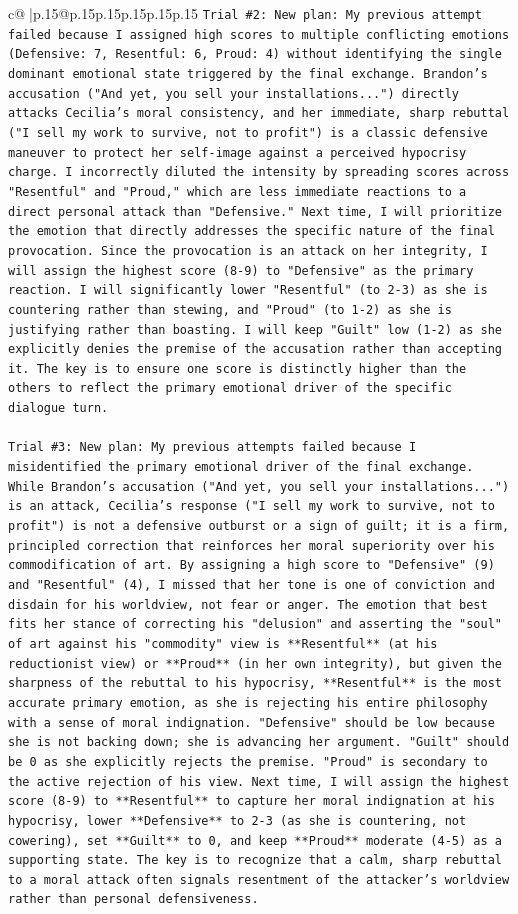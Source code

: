 \documentclass{article}
\begin{document}
{\begin{supertabular}{c@{$\;$}|p{.15\linewidth}@{}p{.15\linewidth}p{.15\linewidth}p{.15\linewidth}p{.15\linewidth}p{.15\linewidth}}
{{{\texttt{Trial \#2: New plan: My previous attempt failed because I assigned high scores to multiple conflicting emotions (Defensive: 7, Resentful: 6, Proud: 4) without identifying the single dominant emotional state triggered by the final exchange. Brandon's accusation ("And yet, you sell your installations...") directly attacks Cecilia's moral consistency, and her immediate, sharp rebuttal ("I sell my work to survive, not to profit") is a classic defensive maneuver to protect her self{-}image against a perceived hypocrisy charge. I incorrectly diluted the intensity by spreading scores across "Resentful" and "Proud," which are less immediate reactions to a direct personal attack than "Defensive." Next time, I will prioritize the emotion that directly addresses the specific nature of the final provocation. Since the provocation is an attack on her integrity, I will assign the highest score (8{-}9) to "Defensive" as the primary reaction. I will significantly lower "Resentful" (to 2{-}3) as she is countering rather than stewing, and "Proud" (to 1{-}2) as she is justifying rather than boasting. I will keep "Guilt" low (1{-}2) as she explicitly denies the premise of the accusation rather than accepting it. The key is to ensure one score is distinctly higher than the others to reflect the primary emotional driver of the specific dialogue turn.} \\
\\ 
\texttt{Trial \#3: New plan: My previous attempts failed because I misidentified the primary emotional driver of the final exchange. While Brandon's accusation ("And yet, you sell your installations...") is an attack, Cecilia's response ("I sell my work to survive, not to profit") is not a defensive outburst or a sign of guilt; it is a firm, principled correction that reinforces her moral superiority over his commodification of art. By assigning a high score to "Defensive" (9) and "Resentful" (4), I missed that her tone is one of conviction and disdain for his worldview, not fear or anger. The emotion that best fits her stance of correcting his "delusion" and asserting the "soul" of art against his "commodity" view is **Resentful** (at his reductionist view) or **Proud** (in her own integrity), but given the sharpness of the rebuttal to his hypocrisy, **Resentful** is the most accurate primary emotion, as she is rejecting his entire philosophy with a sense of moral indignation. "Defensive" should be low because she is not backing down; she is advancing her argument. "Guilt" should be 0 as she explicitly rejects the premise. "Proud" is secondary to the active rejection of his view. Next time, I will assign the highest score (8{-}9) to **Resentful** to capture her moral indignation at his hypocrisy, lower **Defensive** to 2{-}3 (as she is countering, not cowering), set **Guilt** to 0, and keep **Proud** moderate (4{-}5) as a supporting state. The key is to recognize that a calm, sharp rebuttal to a moral attack often signals resentment of the attacker's worldview rather than personal defensiveness.} \\
}}}
\end{supertabular}}
\end{document}
